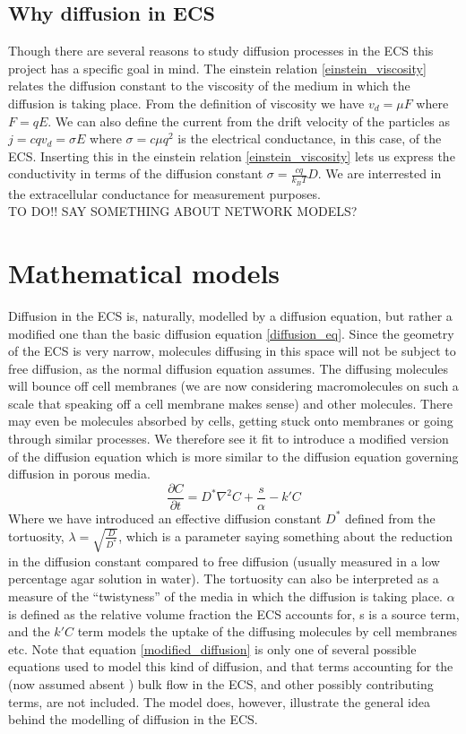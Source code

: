\documentclass[a4paper,english, 12pt, twoside]{article}
\renewcommand{\d}{\partial}
\begin{document}
\subsection{Why diffusion in ECS}
Though there are several reasons to study diffusion processes in the ECS this project has a specific goal in mind. 
The einstein relation \ref{einstein_viscosity} relates the diffusion constant to the viscosity of the medium in which the diffusion is taking place. 
From the definition of viscosity we have $v_d = \mu F$ where $F = qE$. 
We can also define the current from the drift velocity of the particles as $j = cqv_d = \sigma E$ where $\sigma = c\mu q^2$ is the electrical conductance, in this case, of the ECS. 
Inserting this in the einstein relation \ref{einstein_viscosity} lets us express the conductivity in terms of the diffusion constant $\sigma = \frac{cq}{k_B T}D$. 
We are interrested in the extracellular conductance for measurement purposes. \\
TO DO!! SAY SOMETHING ABOUT NETWORK MODELS?

\section{Mathematical models}
Diffusion in the ECS is, naturally, modelled by a diffusion equation, but rather a modified one than the basic diffusion equation \ref{diffusion_eq}. 
Since the geometry of the ECS is very narrow, molecules diffusing in this space will not be subject to free diffusion, as the normal diffusion equation assumes. 
The diffusing molecules will bounce off cell membranes (we are now considering macromolecules on such a scale that speaking off a cell membrane makes sense) and other molecules. 
There may even be molecules absorbed by cells, getting stuck onto membranes or going through similar processes. 
We therefore see it fit to introduce a modified version of the diffusion equation which is more similar to the diffusion equation governing diffusion in porous media. 
\begin{equation}\label{modified_diffusion}
  \frac{\d C}{\d t} = D^*\nabla^2C +\frac{s}{\alpha} -k'C
\end{equation}
Where we have introduced an effective diffusion constant $D^*$ defined from the tortuosity, $\lambda = \sqrt{\frac{D}{D^*}}$, which is a parameter saying something about the reduction in the diffusion constant compared to free diffusion (usually measured in a low percentage agar solution in water). 
The tortuosity can also be interpreted as a measure of the ``twistyness'' of the media in which the diffusion is taking place. 
$\alpha$ is defined as the relative volume fraction the ECS accounts for, s is a source term, and the $k'C$ term models the uptake of the diffusing molecules by cell membranes etc. 
Note that equation \ref{modified_diffusion} is only one of several possible equations used to model this kind of diffusion, and that terms accounting for the (now assumed absent \cite{nicholson2001diffusion}) bulk flow in the ECS, and other possibly contributing terms, are not included. 
The model does, however, illustrate the general idea behind the modelling of diffusion in the ECS.
\end{document}
